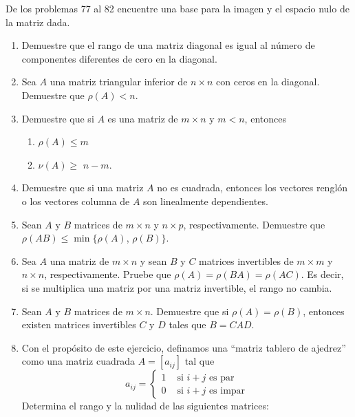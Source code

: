 De los problemas 77 al 82 encuentre una base para la imagen y el espacio nulo de la matriz dada.
\begin{multienumerate}\setcounter{multienumi}{76}
\end{multienumerate}
\begin{enumerate}[start=83]
    \item Demuestre que el rango de una matriz diagonal es igual al número de componentes diferentes de cero en la diagonal.
    \item Sea $A$ una matriz triangular inferior de $n \times n$ con ceros en la diagonal. Demuestre que $\rho(A)<n$.
    \newpage
    \item Demuestre que si $A$ es una matriz de $m \times n$ y $m<n$, entonces
    \begin{enumerate}
        \item $\rho(A) \leq m$
        \item $\nu(A) \geq$ $n-m$.
    \end{enumerate}
    \item Demuestre que si una matriz $A$ no es cuadrada, entonces los vectores renglón o los vectores columna de $A$ son linealmente dependientes.
    \item Sean $A$ y $B$ matrices de $m \times n$ y $n \times p$, respectivamente. Demuestre que $\rho(A B) \leq \min\{\rho(A)$, $\rho(B)\big\}$.
    \item Sea $A$ una matriz de $m \times n$ y sean $B$ y $C$ matrices invertibles de $m \times m$ y $n \times n$, respectivamente. Pruebe que $\rho(A)=\rho(B A)=\rho(A C)$. Es decir, si se multiplica una matriz por una matriz invertible, el rango no cambia.
    \item Sean $A$ y $B$ matrices de $m \times n$. Demuestre que si $\rho(A)=\rho(B)$, entonces existen matrices invertibles $C$ y $D$ tales que $B=C A D$.
    \item Con el propósito de este ejercicio, definamos una “matriz tablero de ajedrez” como una matriz cuadrada $A = [a_{ij}]$ tal que
    $$a_{ij} = \begin{cases}
        1 & \text{ si } i + j \text{ es par} \\
        0 & \text{ si } i + j \text{ es impar}
    \end{cases}$$
    Determina el rango y la nulidad de las siguientes matrices:

\end{enumerate}
